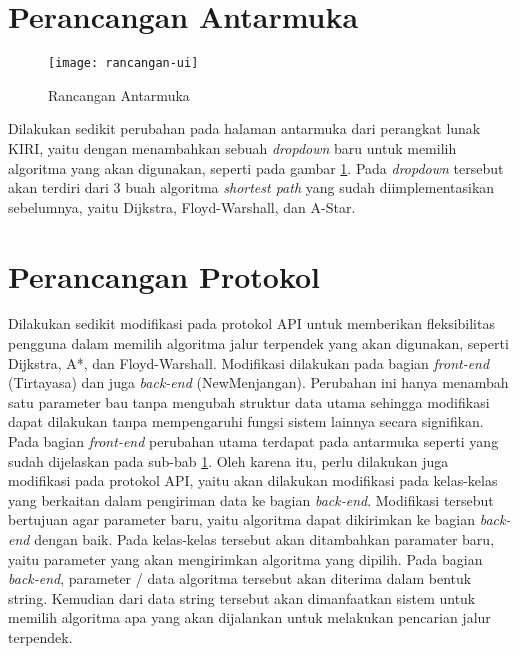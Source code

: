 \section{Perancangan Antarmuka}
\label{sec:rancanganui}

\begin{figure}[H]
    \centering
    \texttt{[image: rancangan-ui]}
    \caption{Rancangan Antarmuka}
    \label{fig:rancanganui}
\end{figure}

\noindent
Dilakukan sedikit perubahan pada halaman antarmuka dari perangkat lunak KIRI, yaitu dengan menambahkan sebuah \textit{dropdown} baru untuk memilih algoritma yang akan digunakan, seperti pada gambar \ref{fig:rancanganui}. Pada \textit{dropdown} tersebut akan terdiri dari 3 buah algoritma \textit{shortest path} yang sudah diimplementasikan sebelumnya, yaitu Dijkstra, Floyd-Warshall, dan A-Star. 

\newpage
\section{Perancangan Protokol}
Dilakukan sedikit modifikasi pada protokol API untuk memberikan fleksibilitas pengguna dalam memilih algoritma jalur terpendek yang akan digunakan, seperti Dijkstra, A*, dan Floyd-Warshall. Modifikasi dilakukan pada bagian \textit{front-end} (Tirtayasa) dan juga \textit{back-end} (NewMenjangan). Perubahan ini hanya menambah satu parameter bau tanpa mengubah struktur data utama sehingga modifikasi dapat dilakukan tanpa mempengaruhi fungsi sistem lainnya secara signifikan.
\\
Pada bagian \textit{front-end} perubahan utama terdapat pada antarmuka seperti yang sudah dijelaskan pada sub-bab \ref{sec:rancanganui}. Oleh karena itu, perlu dilakukan juga modifikasi pada protokol API, yaitu akan dilakukan modifikasi pada kelas-kelas yang berkaitan dalam pengiriman data ke bagian \textit{back-end}. Modifikasi tersebut bertujuan agar parameter baru, yaitu algoritma dapat dikirimkan ke bagian \textit{back-end} dengan baik. Pada kelas-kelas tersebut akan ditambahkan paramater baru, yaitu parameter yang akan mengirimkan algoritma yang dipilih. Pada bagian \textit{back-end}, parameter / data algoritma tersebut akan diterima dalam bentuk string. Kemudian dari data string tersebut akan dimanfaatkan sistem untuk memilih algoritma apa yang akan dijalankan untuk melakukan pencarian jalur terpendek.